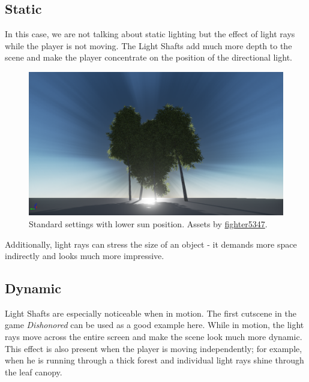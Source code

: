 \documentclass[A4]{article}
\begin{document}
	\subsection*{Static}
	In this case, we are not talking about static lighting but the effect of light rays while the player is not moving. The Light Shafts add much more depth to the scene and make the player concentrate on the position of the directional light.
	\begin{figure}
		\vspace{-20px}
		\begin{center}
			\includegraphics[scale=0.13]{OcclusionSmall.png}
		\end{center}
		\vspace{-20px}
		\caption{Standard settings with lower sun position. Assets by \href{https://forums.unrealengine.com/showthread.php?59812-FREE-Foliage-Starter-Kit}{fighter5347}.}
		\vspace{-20px}
	\end{figure}
	Additionally, light rays can stress the size of an object - it demands more space indirectly and looks much more impressive.
	
	\clearpage
	
	\subsection*{Dynamic}
	Light Shafts are especially noticeable when in motion. The first cutscene in the game \textit{Dishonored} can be used as a good example here. While in motion, the light rays move across the entire screen and make the scene look much more dynamic. This effect is also present when the player is moving independently; for example, when he is running through a thick forest and individual light rays shine through the leaf canopy.
	
\end{document}
